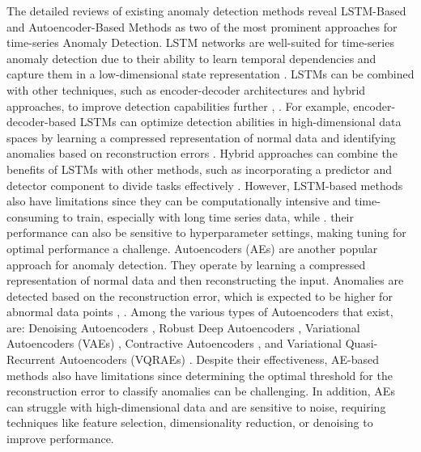\documentclass[conference]{IEEEtran}
\begin{document}
The detailed reviews of existing anomaly detection methods reveal LSTM-Based and Autoencoder-Based Methods as two of the most prominent approaches for time-series Anomaly Detection.  
LSTM networks are well-suited for time-series anomaly detection due to their ability to learn temporal dependencies and capture them in a low-dimensional state representation \cite{HOJJATI2024106106,10744017}. LSTMs can be combined with other techniques, such as encoder-decoder architectures and hybrid approaches, to improve detection capabilities further \cite{SGUEGLIA2022170}, \cite{HOJJATI2024106106}. For example, encoder-decoder-based LSTMs can optimize detection abilities in high-dimensional data spaces by learning a compressed representation of normal data and identifying anomalies based on reconstruction errors \cite{SGUEGLIA2022170,aerospace6110117}. Hybrid approaches can combine the benefits of LSTMs with other methods, such as incorporating a predictor and detector component to divide tasks effectively \cite{SGUEGLIA2022170}.
However, LSTM-based methods also have limitations since they can be computationally intensive and time-consuming to train, especially with long time series data, while  \cite{8926446,HOJJATI2024106106}. 
their performance can also be sensitive to hyperparameter settings, making tuning for optimal performance a challenge.
Autoencoders (AEs) are another popular approach for anomaly detection. They operate by learning a compressed representation of normal data and then reconstructing the input. Anomalies are detected based on the reconstruction error, which is expected to be higher for abnormal data points \cite{10.1145/3444690}, \cite{10.1007/978-3-030-73100-7_60}. Among the various types of Autoencoders that exist, are:
Denoising Autoencoders \cite{s23052844,10.1145/3691338},
Robust Deep Autoencoders \cite{10.1145/3691338},
Variational Autoencoders (VAEs) \cite{9523565},
Contractive Autoencoders  \cite{SGUEGLIA2022170},
and Variational Quasi-Recurrent Autoencoders (VQRAEs) \cite{8079887}.
Despite their effectiveness, AE-based methods also have limitations since determining the optimal threshold for the reconstruction error to classify anomalies can be challenging. In addition, AEs can struggle with high-dimensional data and are sensitive to noise, requiring techniques like feature selection, dimensionality reduction, or denoising to improve performance.
 
\end{document}
